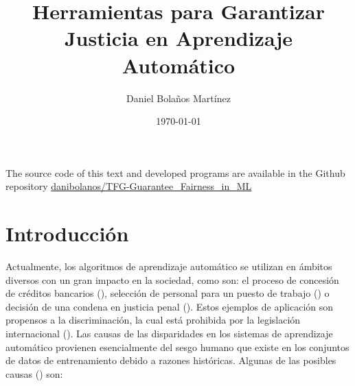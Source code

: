 \documentclass[oneside,openright,titlepage,numbers=noenddot,openany,headinclude,footinclude=true,
cleardoublepage=empty,abstractoff,BCOR=5mm,paper=a4,fontsize=12pt,main=spanish]{scrreprt}
\author{Daniel Bolaños Martínez}
\date{\today}
\title{Herramientas para Garantizar \\Justicia en Aprendizaje Automático}
\begin{document}
\maketitle



\newpage
\vspace*{\fill}
\doclicenseThis
The source code of this text and developed programs are available in the Github repository \href{https://github.com/danibolanos/TFG-Guarantee_Fairness_in_ML.git}{danibolanos/TFG-Guarantee\_Fairness\_in\_ML}









\tableofcontents


\chapter{Introducción}

Actualmente, los algoritmos de aprendizaje automático se utilizan en ámbitos diversos con un gran impacto en la sociedad, como son: el proceso de concesión de créditos bancarios (\cite{prestamo2018}), selección de personal para un puesto de trabajo (\cite{contratar2015}) o decisión de una condena en justicia penal (\cite{condena2016}). Estos ejemplos de aplicación son propensos a la discriminación, la cual está prohibida por la legislación internacional (\cite{ley1964}). Las causas de las disparidades en los sistemas de aprendizaje automático provienen esencialmente del sesgo humano que existe en los conjuntos de datos de entrenamiento debido a razones históricas. Algunas de las posibles causas (\cite{bigdata2016}) son:
\end{document}
